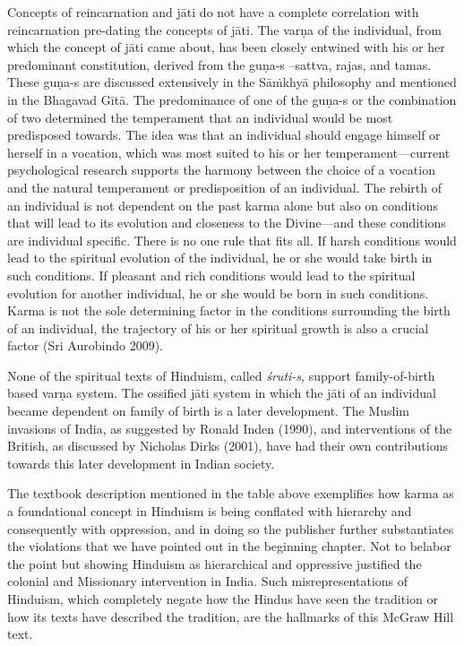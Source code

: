 Concepts of reincarnation and jāti do not have a complete correlation with reincarnation pre-dating the concepts of jāti. The varṇa of the individual, from which the concept of jāti came about, has been closely entwined with his or her predominant constitution, derived from the \hbox{guṇa-s} –sattva, rajas, and tamas. These guṇa-s are discussed extensively in the Sāṁkhyā philosophy and mentioned in the Bhagavad Gītā. The predominance of one of the guṇa-s or the combination of two determined the temperament that an individual would be most predisposed towards. The idea was that an individual should engage himself or herself in a vocation, which was most suited to his or her temperament—current psychological research supports the harmony between the choice of a vocation and the natural temperament or predisposition of an individual. The rebirth of an individual is not dependent on the past karma alone but also on conditions that will lead to its evolution and closeness to the Divine—and these conditions are individual specific. There is no one rule that fits all. If harsh conditions would lead to the spiritual evolution of the individual, he or she would take birth in such conditions. If pleasant and rich conditions would lead to the spiritual evolution for another individual, he or she would be born in such conditions. Karma is not the sole determining factor in the conditions surrounding the birth of an individual, the trajectory of his or her spiritual growth is also a crucial factor (Sri Aurobindo 2009). 

None of the spiritual texts of Hinduism, called \textit{śruti-s},  support family-of-birth based varṇa system. The ossified jāti system in which the jāti of an individual became dependent on family of birth is a later development. The Muslim invasions of India, as suggested by Ronald Inden (1990), and interventions of the British, as discussed by Nicholas Dirks (2001), have had their own contributions towards this later development in Indian society. 

The textbook description mentioned in the table above exemplifies how karma as a foundational concept in Hinduism is being conflated with hierarchy and consequently with oppression, and in doing so the publisher further substantiates the violations that we have pointed out in the beginning chapter. Not to belabor the point but showing Hinduism as hierarchical and oppressive justified the colonial and Missionary intervention in India. Such misrepresentations of Hinduism, which completely negate how the Hindus have seen the tradition or how its texts have described the tradition, are the hallmarks of this McGraw Hill text.

